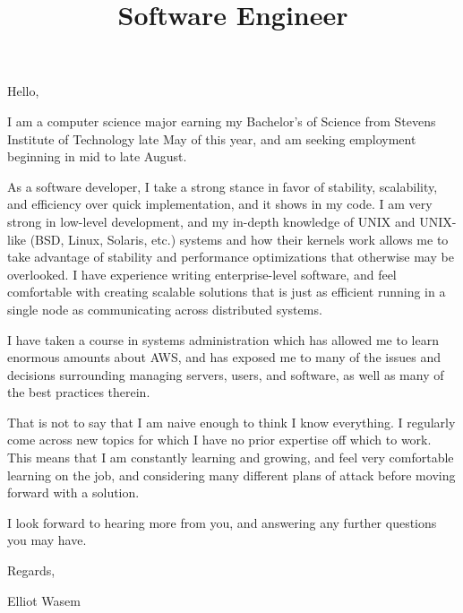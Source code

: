 \documentclass[12pt,letterpaper,roman]{moderncv}
\title{Software Engineer}
\begin{document}
\maketitle{}

\sethintscolumntowidth{\ }
Hello,\bigskip

I am a computer science major earning my Bachelor's of Science from Stevens
Institute of Technology late May of this year, and am seeking employment
beginning in mid to late August.\bigskip

As a software developer, I take a strong stance in favor of stability,
scalability, and efficiency over quick implementation, and it shows in my
code. I am very strong in low-level development, and my in-depth knowledge
of UNIX and UNIX-like (BSD, Linux, Solaris, etc.) systems and how their kernels
work allows me to take advantage of stability and performance optimizations that
otherwise may be overlooked. I have experience writing enterprise-level
software, and feel comfortable with creating scalable solutions that is just as
efficient running in a single node as communicating across distributed
systems.\bigskip

I have taken a course in systems administration which has allowed me to learn
enormous amounts about AWS, and has exposed me to many of the issues and
decisions surrounding managing servers, users, and software, as well as many of
the best practices therein.\bigskip

That is not to say that I am naive enough to think I know everything. I
regularly come across new topics for which I have no prior expertise off which
to work. This means that I am constantly learning and growing, and feel very
comfortable learning on the job, and considering many different plans of attack
before moving forward with a solution.\bigskip

I look forward to hearing more from you, and answering any further questions you
may have.\bigskip

Regards,

Elliot Wasem
\end{document}
